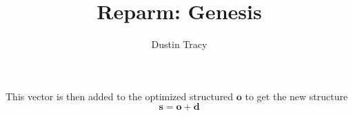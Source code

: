 \message{ !name(genesis.tex)}\documentclass[12pt]{article}
\title{Reparm: Genesis}
\author{Dustin Tracy}
\begin{document}

This vector is then added to the optimized structured $\mathbf{o}$ to get the new structure
\begin{equation}
  \mathbf{s} = \mathbf{o} + \mathbf{d}
\end{equation}
\end{document}
